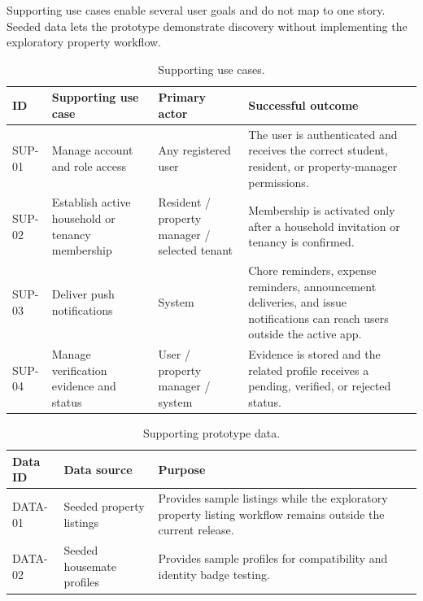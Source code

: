\documentclass[11pt,a4paper]{article}
\begin{document}
Supporting use cases enable several user goals and do not map to one story. Seeded data lets the prototype demonstrate discovery without implementing the exploratory property workflow.

\begin{table}[H]
    \centering
    \small
    \caption{Supporting use cases.}
    \begin{tabularx}{\textwidth}{@{}L{1.4cm}L{4.2cm}L{3.2cm}Y@{}}
        \toprule
        ID & Supporting use case & Primary actor & Successful outcome\\
        \midrule
        SUP-01 & Manage account and role access & Any registered user & The user is authenticated and receives the correct student, resident, or property-manager permissions.\\
        SUP-02 & Establish active household or tenancy membership & Resident / property manager / selected tenant & Membership is activated only after a household invitation or tenancy is confirmed.\\
        SUP-03 & Deliver push notifications & System & Chore reminders, expense reminders, announcement deliveries, and issue notifications can reach users outside the active app.\\
        SUP-04 & Manage verification evidence and status & User / property manager / system & Evidence is stored and the related profile receives a pending, verified, or rejected status.\\
        \bottomrule
    \end{tabularx}
    \label{tabsupportingusecases}
\end{table}

\begin{table}[H]
    \centering
    \small
    \caption{Supporting prototype data.}
    \begin{tabularx}{\textwidth}{@{}L{1.6cm}L{3.6cm}Y@{}}
        \toprule
        Data ID & Data source & Purpose\\
        \midrule
        DATA-01 & Seeded property listings & Provides sample listings while the exploratory property listing workflow remains outside the current release.\\
        DATA-02 & Seeded housemate profiles & Provides sample profiles for compatibility and identity badge testing.\\
        \bottomrule
    \end{tabularx}
    \label{tabprototypedata}
\end{table}
\end{document}
